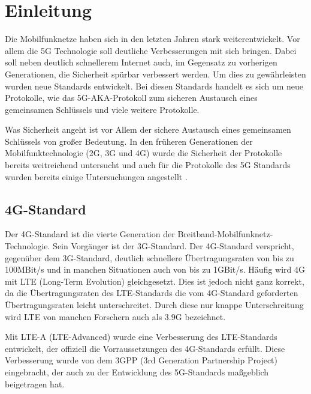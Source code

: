 \chapter{Einleitung}
\label{chap:1}

Die Mobilfunknetze haben sich in den letzten Jahren stark weiterentwickelt. 
Vor allem die 5G Technologie soll deutliche Verbesserungen mit sich bringen. 
Dabei soll neben deutlich schnellerem Internet auch, im Gegensatz zu vorherigen Generationen, die Sicherheit spürbar verbessert werden.
Um dies zu gewährleisten wurden neue Standards entwickelt. 
Bei diesen Standards handelt es sich um neue Protokolle, wie das 5G-AKA-Protokoll zum sicheren Austausch eines gemeinsamen Schlüssels und viele weitere Protokolle.

Was Sicherheit angeht ist vor Allem der sichere Austausch eines gemeinsamen Schlüssels von großer Bedeutung. 
In den früheren Generationen der Mobilfunktechnologie (2G, 3G und 4G) wurde die Sicherheit der Protokolle bereits weitreichend untersucht und auch für die Protokolle des 5G Standards wurden bereits einige Untersuchungen angestellt \cite{Compare}.


\section{4G-Standard}
Der 4G-Standard ist die vierte Generation der Breitband-Mobilfunknetz-Technologie. %
Sein Vorgänger ist der 3G-Standard. 
Der 4G-Standard verspricht, gegenüber dem 3G-Standard, deutlich schnellere Übertragungsraten von bis zu 100MBit/s und in manchen Situationen auch von bis zu 1GBit/s. %
Häufig wird 4G mit LTE (Long-Term Evolution) gleichgesetzt. %
Dies ist jedoch nicht ganz korrekt, da die Übertragungsraten des LTE-Standards die vom 4G-Standard geforderten Übertragungsraten leicht unterschreitet. 
Durch diese nur knappe Unterschreitung wird LTE von manchen Forschern auch als 3.9G bezeichnet. %

Mit LTE-A (LTE-Advanced) wurde eine Verbesserung des LTE-Standards entwickelt, der offiziell die Vorraussetzungen des 4G-Standards erfüllt. %
Diese Verbesserung wurde von dem 3GPP (3rd Generation Partnership Project) eingebracht, der auch zu der Entwicklung des 5G-Standards maßgeblich beigetragen hat. %


